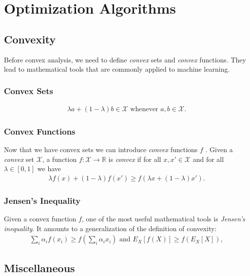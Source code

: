 \documentclass[a4paper,12pt]{article}
\theoremstyle{definition}
\begin{document}
\section{Optimization Algorithms}

\subsection*{Convexity}
Before convex analysis, we need to define \emph{convex} sets and \emph{convex} functions. They lead to mathematical tools that are commonly applied to machine learning.

\subsubsection*{Convex Sets}
\begin{equation*}
    \begin{aligned}
        \lambda  a + (1-\lambda)  b \in \mathcal{X} \text{ whenever } a, b \in \mathcal{X}.
    \end{aligned}
\end{equation*}

\subsubsection*{Convex Functions}

Now that we have convex sets we can introduce \emph{convex} functions $f$ . Given a \emph{convex} set $\mathcal{X}$, a function $f: \mathcal{X} \to \mathbb{R}$ is \emph{convex} if for all
$x, x' \in \mathcal{X}$ and for all $\lambda \in [0, 1]$ we have
\begin{equation*}
    \begin{aligned}
        \lambda f(x) + (1-\lambda) f(x') \geq f(\lambda x + (1-\lambda) x').
    \end{aligned}
\end{equation*}

\subsubsection*{Jensen's Inequality}
Given a convex function $f$, one of the most useful mathematical tools is \emph{Jensen's inequality}. It amounts to a generalization of the definition of convexity:
\begin{equation*}
    \begin{aligned}
        \sum_i \alpha_i f(x_i)  \geq f\left(\sum_i \alpha_i x_i\right)    \text{ and }    E_X[f(X)]  \geq f\left(E_X[X]\right),
    \end{aligned}
\end{equation*}










\newpage
\subsection*{Miscellaneous}
\end{document}

